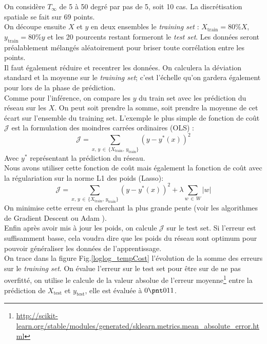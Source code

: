 \documentclass[a4paper,12pt]{article}
\newcommand{\bepar}[1]{
	\left( #1 \right)  
}
\newcommand{\J}{\mathcal{J}}
\newcommand{\tinf}{$T_\infty$}
\numberwithin{equation}{section} %
\begin{document}
\noindent On considère \tinf $ $ de 5 à 50 degré par pas de 5, soit 10 cas. La discrétisation spatiale se fait sur 69 points.\\
On découpe ensuite $X$ et $y$ en deux ensembles le \textit{training set} : $X_{\text{train}} = 80\% X$, $y_{\text{train}}= 80\% y$ et les 20 pourcents restant formeront le \textit{test set}. Les données seront préalablement mélangés aléatoirement pour briser toute corrélation entre les points.\\
Il faut également réduire et recentrer les données. On calculera la déviation standard et la moyenne sur le \textit{training set}; c'est l'échelle qu'on gardera également pour lors de la phase de prédiction.\\
Comme pour l'inférence, on compare les $y$ du train set avec les prédiction du réseau sur les $X$. On peut soit prendre la somme, soit prendre la moyenne de cet écart sur l'ensemble du training set. L'exemple le plus simple de fonction de coût $\J$ est la formulation des moindres carrées ordinaires (OLS)  :
\begin{equation}
\J = \sum_{x, \, y\, \in\, \{X_{\text{train}},\, y_{\text{train}}\}} \bepar{y - y^*\bepar{x}}^2 \tag{OLS} \label{JOLS}
\end{equation}
Avec $y^*$ représentant la prédiction du réseau. \\
Nous avons utiliser cette fonction de coût mais également la fonction de coût avec la régulariation sur la norme L1 des poids (Lasso):
\begin{equation}
\J = \sum_{x, \, y\, \in\, \{X_{\text{train}},\, y_{\text{train}}\}} \bepar{y - y^*\bepar{x}}^2 + \lambda \sum_{w\, \in\, W} |w| \tag{Lasso} \label{Lasso}
\end{equation}
On minimise cette erreur en cherchant la plus grande pente (voir les algorithmes de Gradient Descent \citep{Goodfellow-et-al-2016} ou Adam \citep{kingma2014adam}).\\
Enfin après avoir mis à jour les poids, on calcule $\J$ sur le test set. Si l'erreur est suffisamment basse, cela voudra dire que les poids du réseau sont optimum pour pouvoir généraliser les données de l'apprentissage.\\
On trace dans la figure Fig.\eqref{loglog_tempCost} l'évolution de la somme des erreurs sur le \textit{training set}. On évalue l'erreur sur le test set pour être sur de ne pas overfitté, on utilise le calcule de la valeur absolue de l'erreur moyenne\footnote{\url{http://scikit-learn.org/stable/modules/generated/sklearn.metrics.mean_absolute_error.html}} entre la prédiction de $X_{\text{test}}$ et $y_{\text{test}}$, elle est évaluée à $0 \pnt 011$.
\end{document}
